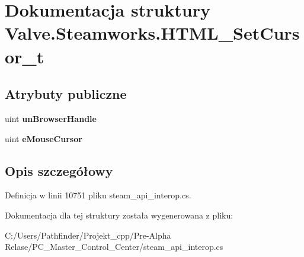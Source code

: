 \hypertarget{struct_valve_1_1_steamworks_1_1_h_t_m_l___set_cursor__t}{}\section{Dokumentacja struktury Valve.\+Steamworks.\+H\+T\+M\+L\+\_\+\+Set\+Cursor\+\_\+t}
\label{struct_valve_1_1_steamworks_1_1_h_t_m_l___set_cursor__t}
\subsection*{Atrybuty publiczne}
\begin{DoxyCompactItemize}
\item 
\mbox{\label{struct_valve_1_1_steamworks_1_1_h_t_m_l___set_cursor__t_ae8cb90ec5957dd352e01d82e9850a1f9}} 
uint {\bfseries un\+Browser\+Handle}
\item 
\mbox{\label{struct_valve_1_1_steamworks_1_1_h_t_m_l___set_cursor__t_a462b579a933cda9ddd2b60ce2d5bc87a}} 
uint {\bfseries e\+Mouse\+Cursor}
\end{DoxyCompactItemize}


\subsection{Opis szczegółowy}


Definicja w linii 10751 pliku steam\+\_\+api\+\_\+interop.\+cs.



Dokumentacja dla tej struktury została wygenerowana z pliku\+:\begin{DoxyCompactItemize}
\item 
C\+:/\+Users/\+Pathfinder/\+Projekt\+\_\+cpp/\+Pre-\/\+Alpha Relase/\+P\+C\+\_\+\+Master\+\_\+\+Control\+\_\+\+Center/steam\+\_\+api\+\_\+interop.\+cs\end{DoxyCompactItemize}

